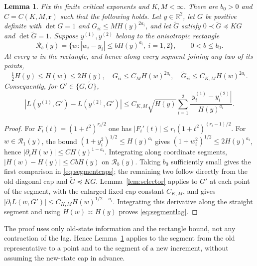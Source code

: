 \documentclass[11pt]{article}
\newtheorem{lemma}[lemma]{Lemma}
\theoremstyle{definition}
\theoremstyle{remark}
\numberwithin{equation}{section}
\newcommand{\R}{\mathbb R}
\begin{document}
\begin{lemma}\label{lem:lagsegments}
Fix the finite critical exponents and $K,M<\infty$.  There are
$b_0>0$ and $C=C(K,M,\boldsymbol r)$ such that the following holds.
Let $y\in\R^2$, let $G$ be positive definite with $\det G=1$ and
$G_{ii}\le M H(y)^{2a_i}$, and let $\widetilde G$ satisfy
$0\prec\widetilde G\preceq K G$ and $\det\widetilde G=1$.  Suppose $y^{(1)},y^{(2)}$
belong to the anisotropic rectangle
\[
 \mathcal R_b(y)=\{w:|w_i-y_i|\le bH(y)^{a_i},\ i=1,2\},
 \qquad 0<b\le b_0.
\]
At every $w$ in the rectangle, and hence along every segment
joining any two of its points,
\begin{equation}\label{eq:segmentcaps}
 \tfrac12H(y)\le H(w)\le 2H(y),\quad
 G_{ii}\le C_M H(w)^{2a_i},\quad
 \widetilde G_{ii}\le C_{K,M}H(w)^{2a_i}.
\end{equation}
Consequently, for $G'\in\{G,\widetilde G\}$,
\begin{equation}\label{eq:segmentlag}
 |L(y^{(1)},G')-L(y^{(2)},G')|
 \le C_{K,M}\sqrt{H(y)}\sum_{i=1}^2
 \frac{|y_i^{(1)}-y_i^{(2)}|}{H(y)^{a_i}}.
\end{equation}
\end{lemma}
\begin{proof}
For $F_i(t)=(1+t^2)^{r_i/2}$ one has
$|F_i'(t)|\le r_i(1+t^2)^{(r_i-1)/2}$. For
$w\in\mathcal R_1(y)$, the bound $(1+y_i^2)^{1/2}\le H(y)^{a_i}$
gives $(1+w_i^2)^{1/2}\le 2H(y)^{a_i}$, hence
$|\partial_iH(w)|\le C H(y)^{1-a_i}$.  Integrating along coordinate segments,
$|H(w)-H(y)|\le CbH(y)$ on $\mathcal R_b(y)$.
Taking $b_0$ sufficiently small gives the first comparison in
\eqref{eq:segmentcaps}; the remaining two follow directly from
the old diagonal cap and $\widetilde G\preceq KG$.
Lemma~\ref{lem:selector} applies to $G'$ at each point of the
segment, with the enlarged fixed cap constant $C_{K,M}$, and gives
$|\partial_iL(w,G')|\le C_{K,M}H(w)^{1/2-a_i}$.
Integrating this derivative along the straight segment and using
$H(w)\asymp H(y)$ proves \eqref{eq:segmentlag}.
\end{proof}

The proof uses only old-state information and the rectangle bound,
not any contraction of the lag. Hence
Lemma~\ref{lem:lagsegments} applies to the segment from the old
representative to a point and to the segment of a new increment,
without assuming the new-state cap in advance.
\end{document}

